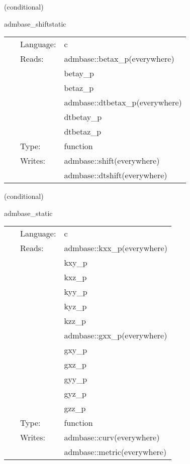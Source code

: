 \vspace{5mm}

   (conditional) 

\hspace{5mm} admbase\_shiftstatic 

\hspace{5mm}{\it copy the shift to the current time level } 


\hspace{5mm}

 \begin{tabular*}{160mm}{cll} 
~ & Language:  & c \\ 
~ & Reads:  & admbase::betax\_p(everywhere) \\ 
~& ~ &betay\_p\\ 
~& ~ &betaz\_p\\ 
~& ~ &admbase::dtbetax\_p(everywhere)\\ 
~& ~ &dtbetay\_p\\ 
~& ~ &dtbetaz\_p\\ 
~ & Type:  & function \\ 
~ & Writes:  & admbase::shift(everywhere) \\ 
~& ~ &admbase::dtshift(everywhere)\\ 
\end{tabular*} 


\vspace{5mm}

   (conditional) 

\hspace{5mm} admbase\_static 

\hspace{5mm}{\it copy the metric and extrinsic curvature to the current time level } 


\hspace{5mm}

 \begin{tabular*}{160mm}{cll} 
~ & Language:  & c \\ 
~ & Reads:  & admbase::kxx\_p(everywhere) \\ 
~& ~ &kxy\_p\\ 
~& ~ &kxz\_p\\ 
~& ~ &kyy\_p\\ 
~& ~ &kyz\_p\\ 
~& ~ &kzz\_p\\ 
~& ~ &admbase::gxx\_p(everywhere)\\ 
~& ~ &gxy\_p\\ 
~& ~ &gxz\_p\\ 
~& ~ &gyy\_p\\ 
~& ~ &gyz\_p\\ 
~& ~ &gzz\_p\\ 
~ & Type:  & function \\ 
~ & Writes:  & admbase::curv(everywhere) \\ 
~& ~ &admbase::metric(everywhere)\\ 
\end{tabular*} 



